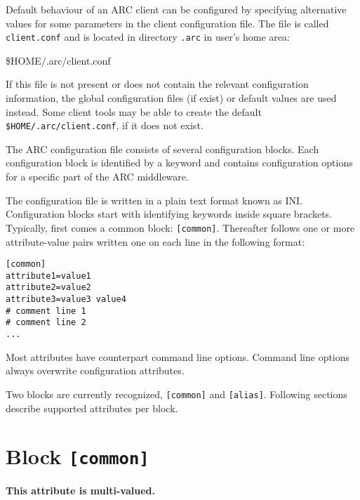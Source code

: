 Default behaviour of an ARC client can be configured by specifying
alternative values for some parameters in the client configuration
file. The file is called \texttt{client.conf} and is located in
directory \texttt{.arc} in user's home area:
\begin{shaded}
 {\$}HOME/.arc/client.conf
\end{shaded}
If this file is not present or does not contain the relevant
configuration information, the global configuration files (if exist)
or default values are used instead. Some client tools may be able to create
the default \texttt{{\$}HOME/.arc/client.conf}, if it does not exist.

The ARC configuration file consists of several configuration blocks.
Each configuration block is identified by a keyword and contains
configuration options for a specific part of the ARC middleware. 

The configuration file is written in a plain text format known as INI.
Configuration blocks start with identifying keywords inside square brackets.
Typically, first comes a common block: \verb#[common]#. Thereafter follows one
or more attribute-value pairs written one on each line in the following
format:

\begin{framed}
\begin{verbatim}
[common]
attribute1=value1
attribute2=value2
attribute3=value3 value4
# comment line 1
# comment line 2
...
\end{verbatim}
\end{framed}


Most attributes have counterpart command line options. Command line options
always overwrite configuration attributes.

Two blocks are currently recognized, \texttt{[common]} and
\texttt{[alias]}. Following sections describe supported attributes per block.

\section{Block \texttt{[common]}}

{}
\hspace*{0.5cm}
\begin{shaded}
\end{shaded}
\textbf{This attribute is multi-valued.}

